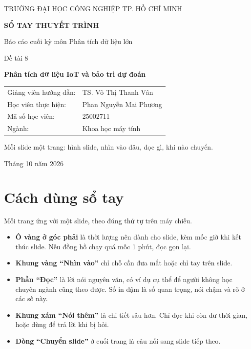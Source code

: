 \documentclass[11pt,a4paper]{article}
\begin{document}
\hypersetup{pageanchor=false}
\begin{titlepage}
\centering
\vspace*{1.5cm}
{\large\textcolor{slate}{TRƯỜNG ĐẠI HỌC CÔNG NGHIỆP TP. HỒ CHÍ MINH}\par}
\vspace{1.2cm}
{\Huge\bfseries\textcolor{iuhblue}{SỔ TAY THUYẾT TRÌNH}\par}
\vspace{0.5cm}
{\large Báo cáo cuối kỳ môn Phân tích dữ liệu lớn\par}
\vspace{1.2cm}
{\Large Đề tài 8\par}
\vspace{0.2cm}
{\LARGE\bfseries Phân tích dữ liệu IoT và bảo trì dự đoán\par}
\vspace{1.5cm}
\begin{tabular}{ll}
Giảng viên hướng dẫn: & TS. Võ Thị Thanh Vân\\
Học viên thực hiện: & Phan Nguyễn Mai Phương\\
Mã số học viên: & 25002711\\
Ngành: & Khoa học máy tính
\end{tabular}
\vfill
{\small\textcolor{slate}{Mỗi slide một trang: hình slide, nhìn vào đâu, đọc gì, khi nào chuyển.}\par}
\vspace{0.4cm}
{\large Tháng 10 năm 2026\par}
\end{titlepage}
\hypersetup{pageanchor=true}

\tableofcontents

\clearpage
\section*{Cách dùng sổ tay}

Mỗi trang ứng với một slide, theo đúng thứ tự trên máy chiếu.
\begin{itemize}
\item \textbf{Ô vàng ở góc phải} là thời lượng nên dành cho slide, kèm mốc giờ khi
      kết thúc slide. Nếu đồng hồ chạy quá mốc 1 phút, đọc gọn lại.
\item \textbf{Khung vàng ``Nhìn vào''} chỉ chỗ cần đưa mắt hoặc chỉ tay trên slide.
\item \textbf{Phần ``Đọc''} là lời nói nguyên văn, có ví dụ cụ thể để người không học
      chuyên ngành cũng theo được. Số in đậm là số quan trọng, nói chậm và rõ ở các số này.
\item \textbf{Khung xám ``Nói thêm''} là chi tiết sâu hơn. Chỉ đọc khi còn dư thời gian, hoặc
      dùng để trả lời khi bị hỏi.
\item \textbf{Dòng ``Chuyển slide''} ở cuối trang là câu nối sang slide tiếp theo.
\end{itemize}
\end{document}
